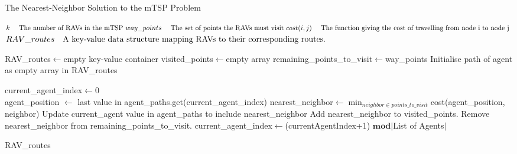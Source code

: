 \begin{algorithm}
\caption{The Nearest-Neighbor Solution to the mTSP Problem}
\label{alg:NNHeuristic}
\begin{algorithmic}[1]
\renewcommand{\algorithmicrequire}{\textbf{Input:}}
\renewcommand{\algorithmicensure}{\textbf{Output:}}

\REQUIRE$ \newline k \quad \text{ The number of RAVs in the mTSP }
\newline way\_points \quad \text{ The set of points the RAVs must visit }
\newline cost(i,j) \quad \text{ The function giving the cost of travelling from node i to node j }
$
\ENSURE $ \newline RAV\_routes \quad \text{A key-value data structure mapping RAVs to their corresponding routes.}
$

\hfill\pagebreak

\STATE RAV\_routes$\leftarrow$empty key-value container
\STATE visited\_points$\leftarrow$empty array
\STATE remaining\_points\_to\_visit$\leftarrow$way\_points
\STATE Initialise path of agent as empty array in RAV\_routes
\ENDFOR

current\_agent\_index$\leftarrow$0\\
\hfill\pagebreak
{}
\STATE agent\_position $\leftarrow$ last value in agent\_paths.get(current\_agent\_index)
\STATE nearest\_neighbor$\leftarrow$\(\displaystyle \min_{neighbor \in points\_to\_visit}\)cost(agent\_position, neighbor)
\STATE Update current\_agent value in agent\_paths to include nearest\_neighbor
\STATE Add nearest\_neighbor to visited\_points.
\STATE Remove nearest\_neighbor from remaining\_points\_to\_visit.
\STATE current\_agent\_index$\leftarrow$(currentAgentIndex+1) $\mathbf{mod}$$\vert$List of Agents$\vert$



\ENDWHILE
\RETURN RAV\_routes
\end{algorithmic} 
\end{algorithm}


